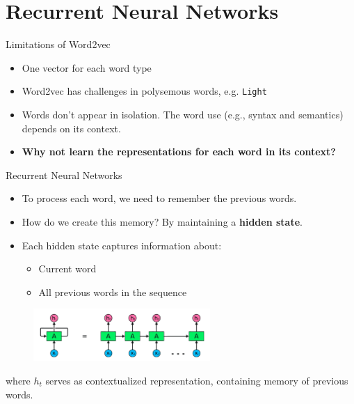 \documentclass[serif, aspectratio=169]{beamer}
\begin{document}
\section{Recurrent Neural Networks}

\begin{frame}{Limitations of Word2vec}
	\begin{itemize} 
		
		\item One vector for each word type
		
		\item Word2vec has challenges in polysemous words, e.g. \texttt{Light}
		\item Words don’t appear in isolation. The word use (e.g., syntax and semantics) depends on its context.
		
		\item \textbf{Why not learn the representations for each word in its context?}
		
	\end{itemize}
\end{frame}

\begin{frame}{Recurrent Neural Networks}
	\begin{itemize}
		\item To process each word, we need to remember the previous words.
		\item How do we create this memory? By maintaining a \textbf{hidden state}.
		\item Each hidden state captures information about:
		\begin{itemize}
			\item Current word
			\item All previous words in the sequence
		\end{itemize}
	\end{itemize}
	
	
	\begin{figure}
		\centering
		\includegraphics[width=0.6\textwidth]{pic/image-RNN.png}
		\label{fig:image-RNN}
	\end{figure}
	
	\begin{center}
		where $h_t$ serves as contextualized representation, containing memory of previous words.
	\end{center}
	
\end{frame}
\end{document}
